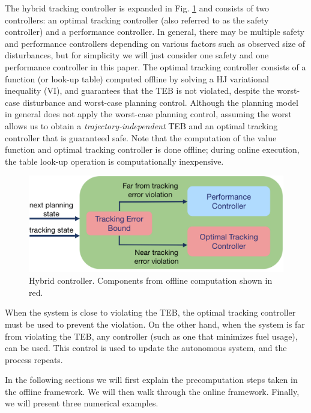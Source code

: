 The hybrid tracking controller is expanded in Fig. \ref{fig:hybrid_ctrl} and consists of two controllers: an optimal tracking controller (also referred to as the safety controller) and a performance controller.
In general, there may be multiple safety and performance controllers depending on various factors such as observed size of disturbances, but for simplicity we will just consider one safety and one performance controller in this paper. 
The optimal tracking controller consists of a function (or look-up table) computed offline by solving a HJ variational inequality (VI), and guarantees that the TEB is not violated, despite the worst-case disturbance and worst-case planning control. 
Although the planning model in general does not apply the worst-case planning control, assuming the worst allows us to obtain a \textit{trajectory-independent} TEB and an optimal tracking controller that is guaranteed safe.
Note that the computation of the value function and optimal tracking controller is done offline; during online execution, the table look-up operation is computationally inexpensive. 
\begin{figure}[h!]
	\centering
	\includegraphics[width=\columnwidth]{fig/hybrid_controller_2}
	\caption{Hybrid controller. Components from offline computation shown in red.}
	\label{fig:hybrid_ctrl}
\end{figure}

When the system is close to violating the TEB, the optimal tracking controller must be used to prevent the violation. 
On the other hand, when the system is far from violating the TEB, any controller (such as one that minimizes fuel usage), can be used. 
This control is used to update the autonomous system, and the process repeats.

In the following sections we will first explain the precomputation steps taken in the offline framework. 
We will then walk through the online framework.
Finally, we will present three numerical examples.

